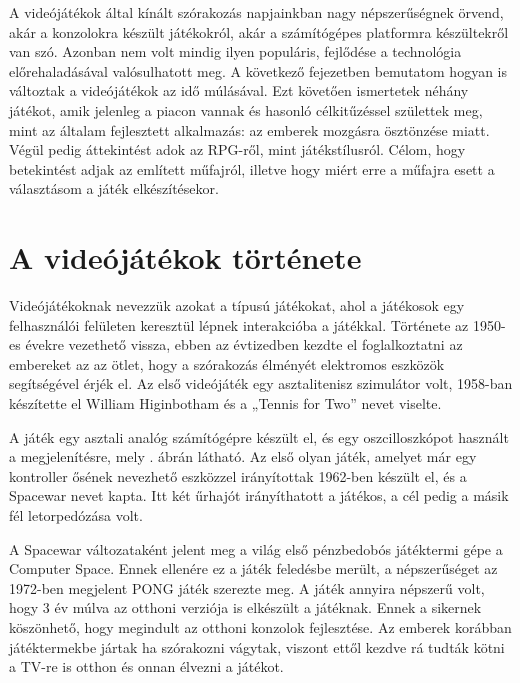 
A videójátékok által kínált szórakozás napjainkban nagy népszerűségnek örvend, akár a konzolokra készült játékokról, akár a számítógépes platformra készültekről van szó.
Azonban nem volt mindig ilyen populáris, fejlődése a technológia előrehaladásával valósulhatott meg. 
A következő fejezetben bemutatom hogyan is változtak a videójátékok az idő múlásával. 
Ezt követően ismertetek néhány játékot, amik jelenleg a piacon vannak és hasonló célkitűzéssel születtek meg, mint az általam fejlesztett alkalmazás: az emberek mozgásra ösztönzése miatt. 
Végül pedig áttekintést adok az RPG-ről, mint játékstílusról. 
Célom, hogy betekintést adjak az említett műfajról, illetve hogy miért erre a műfajra esett a választásom a játék elkészítésekor. 


\section{A videójátékok története}
\label{videojatektortenet}


Videójátékoknak nevezzük azokat a típusú játékokat, ahol a játékosok egy felhasználói felületen keresztül lépnek interakcióba a játékkal. 
Története az 1950-es évekre vezethető vissza, ebben az évtizedben kezdte el foglalkoztatni az embereket az az ötlet, hogy a szórakozás élményét elektromos eszközök segítségével érjék el. 
Az első videójáték egy asztalitenisz szimulátor volt, 1958-ban készítette el William Higinbotham és a „Tennis for Two” nevet viselte. 


A játék egy asztali analóg számítógépre készült el, és egy oszcilloszkópot használt a megjelenítésre, mely . ábrán látható.  
Az első olyan játék, amelyet már egy kontroller ősének nevezhető eszközzel irányítottak 1962-ben készült el, és a Spacewar nevet kapta. 
Itt két űrhajót irányíthatott a játékos, a cél pedig a másik fél letorpedózása volt. 

A Spacewar változataként jelent meg a világ első pénzbedobós játéktermi gépe a Computer Space. 
Ennek ellenére ez a játék feledésbe merült, a népszerűséget az 1972-ben megjelent PONG játék szerezte meg. 
A játék annyira népszerű volt, hogy 3 év múlva az otthoni verziója is elkészült a játéknak. 
Ennek a sikernek köszönhető, hogy megindult az otthoni konzolok fejlesztése. 
Az emberek korábban játéktermekbe jártak ha szórakozni vágytak, viszont ettől kezdve rá tudták kötni a TV-re is otthon és onnan élvezni a játékot. 

